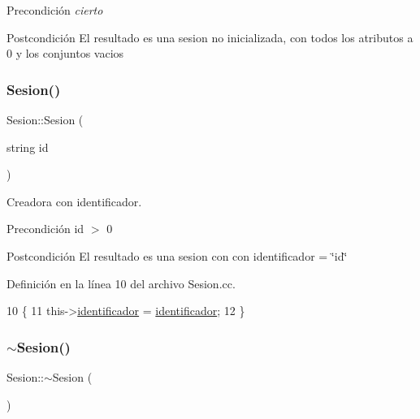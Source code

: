 \begin{DoxyPrecond}{Precondición}
{\itshape cierto} 
\end{DoxyPrecond}
\begin{DoxyPostcond}{Postcondición}
El resultado es una sesion no inicializada, con todos los atributos a 0 y los conjuntos vacios 
\end{DoxyPostcond}
\mbox{\label{class_sesion_a1b7a01575ed1e5a4d05765195dcfc189}} 
\subsubsection{\texorpdfstring{Sesion()}{Sesion()}\hspace{0.1cm}{\footnotesize\ttfamily [2/2]}}
{\footnotesize\ttfamily Sesion\+::\+Sesion (\begin{DoxyParamCaption}\item[{string}]{id }\end{DoxyParamCaption})}



Creadora con identificador. 

\begin{DoxyPrecond}{Precondición}
id $>$ 0 
\end{DoxyPrecond}
\begin{DoxyPostcond}{Postcondición}
El resultado es una sesion con con identificador = \char`\"{}id\char`\"{} 
\end{DoxyPostcond}


Definición en la línea 10 del archivo Sesion.\+cc.


\begin{DoxyCode}
10                                    \{
11     this->\mbox{\hyperlink{class_sesion_a1b9a6519f3476c8c733792dee9b9c842}{identificador}} = \mbox{\hyperlink{class_sesion_a1b9a6519f3476c8c733792dee9b9c842}{identificador}};
12 \}
\end{DoxyCode}
\mbox{\label{class_sesion_acc4bd3e753a45d6b7a01aa27fb8f171f}} 
\subsubsection{\texorpdfstring{$\sim$\+Sesion()}{~Sesion()}}
{\footnotesize\ttfamily Sesion\+::$\sim$\+Sesion (\begin{DoxyParamCaption}{ }\end{DoxyParamCaption})}



